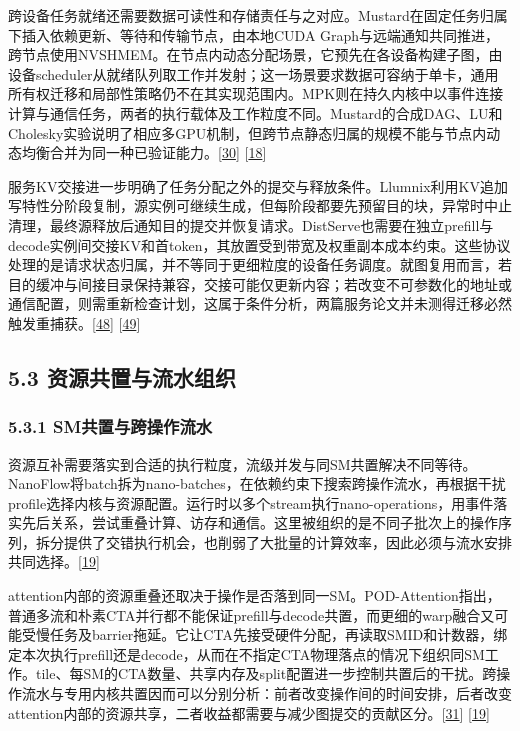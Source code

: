 \documentclass[
  11pt,
  UTF8]{ctexart}
\begin{document}
跨设备任务就绪还需要数据可读性和存储责任与之对应。Mustard在固定任务归属下插入依赖更新、等待和传输节点，由本地CUDA
Graph与远端通知共同推进，跨节点使用NVSHMEM。在节点内动态分配场景，它预先在各设备构建子图，由设备scheduler从就绪队列取工作并发射；这一场景要求数据可容纳于单卡，通用所有权迁移和局部性策略仍不在其实现范围内。MPK则在持久内核中以事件连接计算与通信任务，两者的执行载体及工作粒度不同。Mustard的合成DAG、LU和Cholesky实验说明了相应多GPU机制，但跨节点静态归属的规模不能与节点内动态均衡合并为同一种已验证能力。{[}\protect\hyperlink{ref-turimbetov2025mustard}{30}{]}
{[}\protect\hyperlink{ref-cheng2026mpk}{18}{]}

服务KV交接进一步明确了任务分配之外的提交与释放条件。Llumnix利用KV追加写特性分阶段复制，源实例可继续生成，但每阶段都要先预留目的块，异常时中止清理，最终源释放后通知目的提交并恢复请求。DistServe也需要在独立prefill与decode实例间交接KV和首token，其放置受到带宽及权重副本成本约束。这些协议处理的是请求状态归属，并不等同于更细粒度的设备任务调度。就图复用而言，若目的缓冲与间接目录保持兼容，交接可能仅更新内容；若改变不可参数化的地址或通信配置，则需重新检查计划，这属于条件分析，两篇服务论文并未测得迁移必然触发重捕获。{[}\protect\hyperlink{ref-sun2024llumnix}{48}{]}
{[}\protect\hyperlink{ref-zhong2024distserve}{49}{]}

\hypertarget{section-5-3}{%
\subsection{5.3 资源共置与流水组织}\label{section-5-3}}

\hypertarget{section-5-3-1}{%
\subsubsection{5.3.1 SM共置与跨操作流水}\label{section-5-3-1}}

资源互补需要落实到合适的执行粒度，流级并发与同SM共置解决不同等待。NanoFlow将batch拆为nano-batches，在依赖约束下搜索跨操作流水，再根据干扰profile选择内核与资源配置。运行时以多个stream执行nano-operations，用事件落实先后关系，尝试重叠计算、访存和通信。这里被组织的是不同子批次上的操作序列，拆分提供了交错执行机会，也削弱了大批量的计算效率，因此必须与流水安排共同选择。{[}\protect\hyperlink{ref-zhu2025nanoflow}{19}{]}

attention内部的资源重叠还取决于操作是否落到同一SM。POD-Attention指出，普通多流和朴素CTA并行都不能保证prefill与decode共置，而更细的warp融合又可能受慢任务及barrier拖延。它让CTA先接受硬件分配，再读取SMID和计数器，绑定本次执行prefill还是decode，从而在不指定CTA物理落点的情况下组织同SM工作。tile、每SM的CTA数量、共享内存及split配置进一步控制共置后的干扰。跨操作流水与专用内核共置因而可以分别分析：前者改变操作间的时间安排，后者改变attention内部的资源共享，二者收益都需要与减少图提交的贡献区分。{[}\protect\hyperlink{ref-kamath2025pod}{31}{]}
{[}\protect\hyperlink{ref-zhu2025nanoflow}{19}{]}
\end{document}

